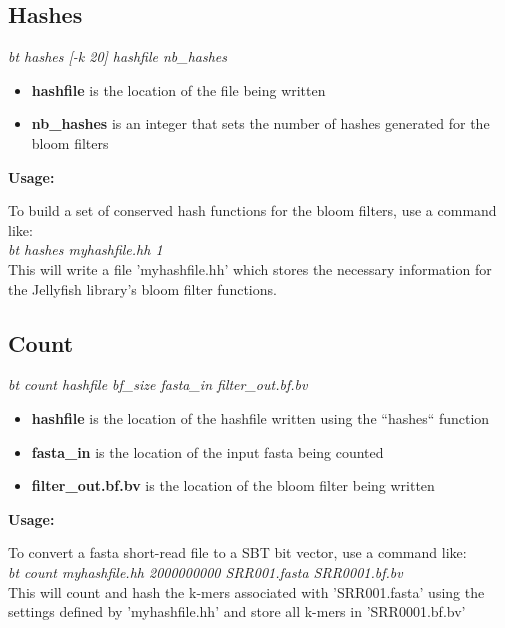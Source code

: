 \documentclass{article}
\begin{document}
\subsection{Hashes} 
\textit{bt hashes [-k 20] hashfile nb\_hashes}
\begin{itemize}
\item \textbf{hashfile} is the location of the file being written
\item \textbf{nb\_hashes} is an integer that sets the number of hashes generated for the bloom filters
\end{itemize}
\textbf{Usage:}

To build a set of conserved hash functions for the bloom filters, use a command like: \\

\textit{bt hashes myhashfile.hh 1} \\

This will write a file 'myhashfile.hh' which stores the necessary information for the Jellyfish library's bloom filter functions.

\subsection{Count}
\textit{bt count hashfile bf\_size fasta\_in filter\_out.bf.bv}
\begin{itemize}
\item \textbf{hashfile} is the location of the hashfile written using the ``hashes`` function
\item \textbf{fasta\_in} is the location of the input fasta being counted
\item \textbf{filter\_out.bf.bv} is the location of the bloom filter being written
\end{itemize}
\textbf{Usage:}

To convert a fasta short-read file to a SBT bit vector, use a command like: \\

\textit{bt count myhashfile.hh 2000000000 SRR001.fasta SRR0001.bf.bv} \\

This will count and hash the k-mers associated with 'SRR001.fasta' using the settings defined by 'myhashfile.hh' and store all k-mers in 'SRR0001.bf.bv'
\end{document}
